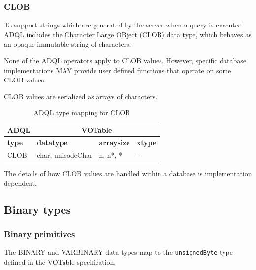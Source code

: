 \documentclass[11pt,a4paper]{ivoa}
\newcommand{\VOTspec}  {VOTable specification\xspace}
\begin{document}
\subsubsection{CLOB}
\label{sec:types.character.clob}

To support strings which are generated by the server when a query is executed
ADQL includes the Character Large OBject (CLOB) data type,
which behaves as an opaque immutable string of characters.

None of the ADQL operators apply to CLOB values.
However, specific database implementations MAY provide user
defined functions that operate on some CLOB values.

CLOB values are serialized as arrays of characters.

\begin{table}[thm]\footnotesize
    \begin{tabular}
        {|p{}|p{}|p{}|p{}|}
        \hline

        \hline
        \multicolumn{1}{|c|}{\textbf{ADQL}} &
        \multicolumn{3}{|c|}{\textbf{VOTable}}
        \tabularnewline
        
        \hline
        \textbf{type} &
        \textbf{datatype} &
        \textbf{arraysize} &
        \textbf{xtype}
        \tabularnewline

        \hline
        CLOB &
        char, unicodeChar &
        n, n*, * &
        -
        \tabularnewline

        \hline
    \end{tabular}
    \caption{ADQL type mapping for CLOB}
    \label{table:types.character.clob}
\end{table}

The details of how CLOB values are handled within a
database is implementation dependent.

\subsection{Binary types}
\label{sec:types.binary}

\subsubsection{Binary primitives}
\label{sec:types.binary.primitive}

The BINARY and VARBINARY data types map to the \verb:unsignedByte: type defined
in the \VOTspec.
\end{document}

